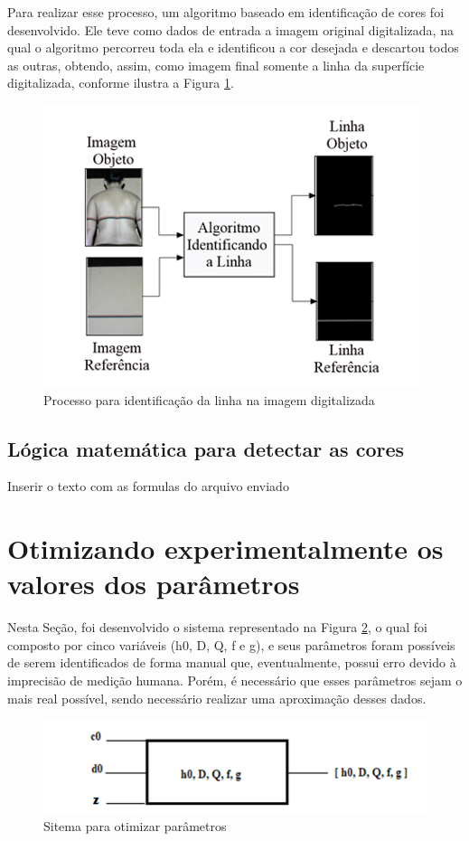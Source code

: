 \documentclass[a4paper, 12pt]{article}
\begin{document}
Para realizar esse processo, um algoritmo baseado em identificação de cores foi desenvolvido. Ele teve como dados de entrada a imagem original digitalizada, na qual o algoritmo percorreu toda ela e identificou a cor desejada e descartou todos as outras, obtendo, assim, como imagem final somente a linha da superfície digitalizada, conforme ilustra a Figura \ref{identificar linha na imagem}.

\begin{figure}[H]
	\centering
		\includegraphics[scale=0.5]{identificar_linha_imagem.png}
	\caption{Processo para identificação da linha na imagem digitalizada}
	\label{identificar linha na imagem}
\end{figure}

\subsection{Lógica matemática para detectar as cores}

Inserir o texto com as formulas do arquivo enviado


\section{Otimizando experimentalmente os valores dos parâmetros}
Nesta Seção, foi desenvolvido o sistema representado na Figura \ref{sitema_otimizacao}, o qual foi composto por cinco variáveis (h0, D, Q, f e g), e seus parâmetros foram possíveis de serem identificados de forma manual que, eventualmente, possui erro devido à imprecisão de medição humana. Porém, é necessário que esses parâmetros sejam o mais real possível, sendo necessário realizar uma aproximação desses dados.

\begin{figure}[H]
	\centering
		\includegraphics[scale=0.5]{sitema_otimizacao.png}
	\caption{Sitema para otimizar parâmetros}
	\label{sitema_otimizacao}
\end{figure}
\end{document}
